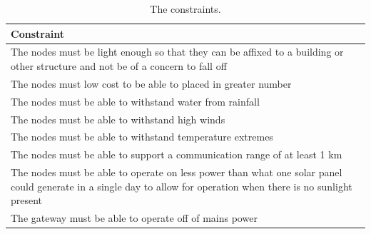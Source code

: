 
\begin{table}[H]
\centering
\caption{The constraints.}
\begin{tabularx}{\linewidth}{|X|}
\hline
Constraint \\
\hline
The nodes must be light enough so that they can be affixed to a building or other structure and not be of a concern to fall off \\\hline
The nodes must low cost to be able to placed in greater number \\\hline
The nodes must be able to withstand water from rainfall \\\hline
The nodes must be able to withstand high winds \\\hline
The nodes must be able to withstand temperature extremes \\\hline
The nodes must be able to support a communication range of at least 1 km\\\hline
The nodes must be able to operate on less power than what one solar panel could generate in a single day to allow for operation when there is no sunlight present \\\hline
The gateway must be able to operate off of mains power \\\hline
\end{tabularx}
\label{tab:constraints}
\end{table}

